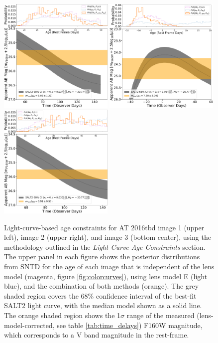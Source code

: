 \documentclass[12pt]{article}
\def\SNABC{AT 2016tbd\xspace}
\begin{document}
\begin{figure}
    \centering
    \includegraphics[width=0.49\textwidth]{Paper/Figures/lightcurve_image1.pdf}
    \includegraphics[width=0.49\textwidth]{Paper/Figures/lightcurve_image2.pdf}
    \includegraphics[width=0.49\textwidth]{Paper/Figures/lightcurve_image3.pdf}
    \caption{Light-curve-based age constraints for \SNABC image 1 (upper left), image 2 (upper right), and image 3 (bottom center), using the methodology outlined in the \textit{Light Curve Age Constraints} section. The upper panel in each figure shows the posterior distributions from SNTD for the age of each image that is independent of the lens model (magenta, figure \ref{fig:colorcurves}), using lens model E (light blue), and the combination of both methods (orange). The grey shaded region covers the 68\% confidence interval of the best-fit SALT2 light curve, with the median model shown as a solid line. The orange shaded region shows the 1$\sigma$ range of the measured (lens-model-corrected, see table \ref{tab:time_delays}) F160W magnitude, which corresponds to a V band magnitude in the rest-frame.}
    \label{fig:lightcurves}
\end{figure}
\end{document}
